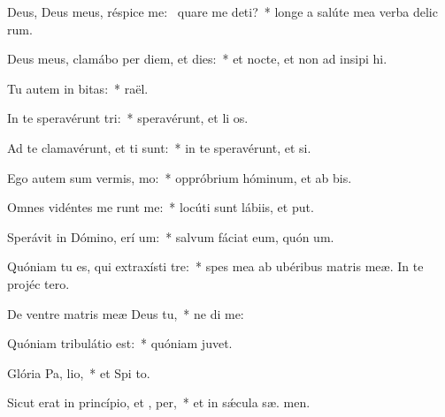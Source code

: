 \item Deus, Deus meus, réspice  me:~\pscross{} quare me deti?~* longe a salúte mea verba delic rum.
\item Deus meus, clamábo per diem, et  dies:~* et nocte, et non ad insipi hi.
\item Tu autem in  bitas:~*  raël.
\item In te speravérunt  tri:~* speravérunt, et li os.
\item Ad te clamavérunt, et  ti sunt:~* in te speravérunt, et   si.
\item Ego autem sum vermis,   mo:~* oppróbrium hóminum, et ab bis.
\item Omnes vidéntes me runt me:~* locúti sunt lábiis, et  put.
\item Sperávit in Dómino, erí um:~* salvum fáciat eum, quón  um.
\item Quóniam tu es, qui extraxísti   tre:~* spes mea ab ubéribus matris meæ. In te projéc   tero.
\item De ventre matris meæ Deus   tu,~* ne di  me:
\item Quóniam tribulátio  est:~* quóniam    juvet.
\item Glória Pa,  lio,~* et Spi to.
\item Sicut erat in princípio, et ,  per,~* et in sǽcula sæ. men.
